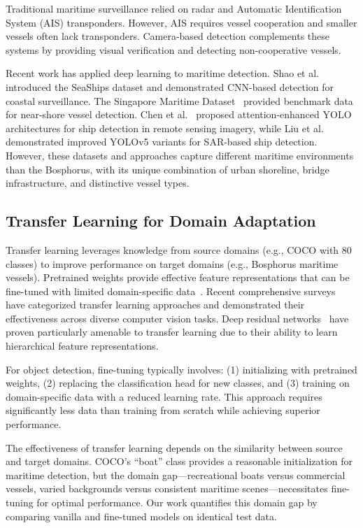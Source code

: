 \documentclass[pdflatex,sn-mathphys-num,Numbered]{sn-jnl}
\begin{document}
Traditional maritime surveillance relied on radar and Automatic Identification System (AIS) transponders. However, AIS requires vessel cooperation and smaller vessels often lack transponders. Camera-based detection complements these systems by providing visual verification and detecting non-cooperative vessels.

Recent work has applied deep learning to maritime detection. Shao et al.~\cite{shao2018seaships} introduced the SeaShips dataset and demonstrated CNN-based detection for coastal surveillance. The Singapore Maritime Dataset~\cite{prasad2017video} provided benchmark data for near-shore vessel detection. Chen et al.~\cite{chen2020ship} proposed attention-enhanced YOLO architectures for ship detection in remote sensing imagery, while Liu et al.~\cite{liu2021abcnet} demonstrated improved YOLOv5 variants for SAR-based ship detection. However, these datasets and approaches capture different maritime environments than the Bosphorus, with its unique combination of urban shoreline, bridge infrastructure, and distinctive vessel types.

\subsection{Transfer Learning for Domain Adaptation}\label{subsec:transfer-learning}

Transfer learning leverages knowledge from source domains (e.g., COCO with 80 classes) to improve performance on target domains (e.g., Bosphorus maritime vessels). Pretrained weights provide effective feature representations that can be fine-tuned with limited domain-specific data~\cite{pan2010survey, weiss2016survey}. Recent comprehensive surveys~\cite{zhuang2020comprehensive} have categorized transfer learning approaches and demonstrated their effectiveness across diverse computer vision tasks. Deep residual networks~\cite{he2016resnet} have proven particularly amenable to transfer learning due to their ability to learn hierarchical feature representations.

For object detection, fine-tuning typically involves: (1) initializing with pretrained weights, (2) replacing the classification head for new classes, and (3) training on domain-specific data with a reduced learning rate. This approach requires significantly less data than training from scratch while achieving superior performance.

The effectiveness of transfer learning depends on the similarity between source and target domains. COCO's ``boat'' class provides a reasonable initialization for maritime detection, but the domain gap---recreational boats versus commercial vessels, varied backgrounds versus consistent maritime scenes---necessitates fine-tuning for optimal performance. Our work quantifies this domain gap by comparing vanilla and fine-tuned models on identical test data.
\end{document}
